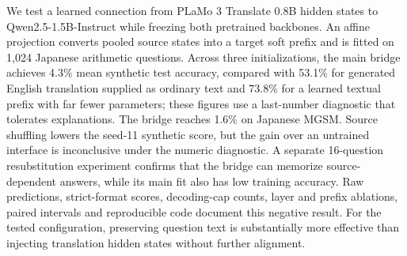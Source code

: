 We test a learned connection from PLaMo 3 Translate 0.8B hidden states to
Qwen2.5-1.5B-Instruct while freezing both pretrained backbones.
An affine projection converts pooled source states into a target soft prefix
and is fitted on 1,024 Japanese arithmetic questions.
Across three initializations, the main bridge achieves 4.3\% mean synthetic test
accuracy, compared with 53.1\% for generated English translation supplied as
ordinary text and 73.8\% for a learned textual prefix with far fewer parameters;
these figures use a last-number diagnostic that tolerates explanations.
The bridge reaches 1.6\% on Japanese MGSM.
Source shuffling lowers the seed-11 synthetic score, but the gain over an
untrained interface is inconclusive under the numeric diagnostic.
A separate 16-question resubstitution experiment confirms that the bridge can
memorize source-dependent answers, while its main fit also has low training
accuracy.
Raw predictions, strict-format scores, decoding-cap counts, layer and prefix
ablations, paired intervals and reproducible code document this negative result.
For the tested configuration, preserving question text is substantially more
effective than injecting translation hidden states without further alignment.
